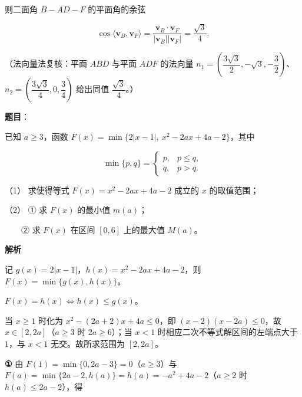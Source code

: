 \begin{answer}
则二面角 \(B-AD-F\) 的平面角的余弦

\nopagebreak[4]
\[
\cos\langle\boldsymbol{v}_{B},\boldsymbol{v}_{F}\rangle=\dfrac{\boldsymbol{v}_{B}\cdot\boldsymbol{v}_{F}}{|\boldsymbol{v}_{B}||\boldsymbol{v}_{F}|}=\dfrac{\sqrt{3}}{4}.
\]

（法向量法复核：平面 \(ABD\) 与平面 \(ADF\) 的法向量 \(n_{1}=\left(\dfrac{3\sqrt{3}}{2},-\sqrt{3},-\dfrac{3}{2}\right)\)、\(n_{2}=\left(\dfrac{3\sqrt{3}}{4},0,\dfrac{3}{4}\right)\) 给出同值 \(\dfrac{\sqrt{3}}{4}\)。）



\end{answer}
\begin{answer}

\textbf{题目}：

已知 \(a\geqslant 3\)，函数 \(F(x)=\min\{2|x-1|,\ x^{2}-2ax+4a-2\}\)，其中

\nopagebreak[4]
\[
\min\{p,q\}=\begin{cases}
p, & p\leqslant q, \\
q, & p>q.
\end{cases}
\]

（1） 求使得等式 \(F(x)=x^{2}-2ax+4a-2\) 成立的 \(x\) 的取值范围；

（2） ① 求 \(F(x)\) 的最小值 \(m(a)\)；

　　② 求 \(F(x)\) 在区间 \([0,6]\) 上的最大值 \(M(a)\)。

\textbf{解析}

记 \(g(x)=2|x-1|\)，\(h(x)=x^{2}-2ax+4a-2\)，则 \(F(x)=\min\{g(x),h(x)\}\)。


\(F(x)=h(x)\iff h(x)\leqslant g(x)\)。

当 \(x\geqslant 1\) 时化为 \(x^{2}-(2a+2)x+4a\leqslant 0\)，即 \((x-2)(x-2a)\leqslant 0\)，故 \(x\in[2,2a]\)（\(a\geqslant 3\) 时 \(2a\geqslant 6\)）；当 \(x<1\) 时相应二次不等式解区间的左端点大于 \(1\)，与 \(x<1\) 无交。故所求范围为 \([2,2a]\)。


\textbf{①} 由 \(F(1)=\min\{0,2a-3\}=0\)（\(a\geqslant 3\)）与 \(F(a)=\min\{2a-2,h(a)\}=h(a)=-a^{2}+4a-2\)（\(a\geqslant 2\) 时 \(h(a)\leqslant 2a-2\)），得


\end{answer}
